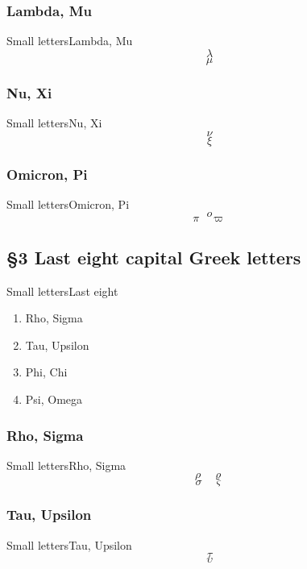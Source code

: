 \documentclass{beamer}
\begin{document}
         \subsubsection{Lambda, Mu}
            \begin{frame}{Small letters}{Lambda, Mu}
               \[ \lambda \]
               \[ \mu \]
            \end{frame}
         \subsubsection{Nu, Xi}
            \begin{frame}{Small letters}{Nu, Xi}
               \[ \nu \]
               \[ \xi \]
            \end{frame}
         \subsubsection{Omicron, Pi}
            \begin{frame}{Small letters}{Omicron, Pi}
               \[ o \]
               \[ \pi \quad \varpi \]
            \end{frame}
      \subsection{§3 Last eight capital Greek letters}
         \begin{frame}{Small letters}{Last eight}
            \begin{enumerate}
               \item Rho, Sigma
               \item Tau, Upsilon
               \item Phi, Chi
               \item Psi, Omega
            \end{enumerate}
         \end{frame}
         \subsubsection{Rho, Sigma}
            \begin{frame}{Small letters}{Rho, Sigma}
               \[ \rho \quad \varrho \]
               \[ \sigma \quad \varsigma \]
            \end{frame}
         \subsubsection{Tau, Upsilon}
            \begin{frame}{Small letters}{Tau, Upsilon}
               \[ \tau \]
               \[ \upsilon \]
            \end{frame}
\end{document}
